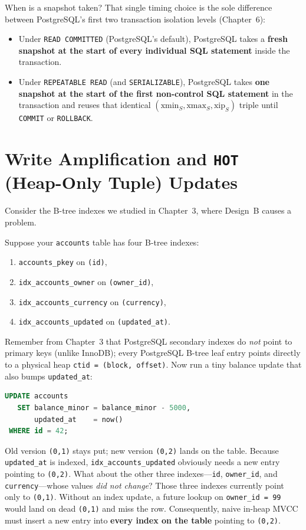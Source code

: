 \begin{walkbox}
When is a snapshot taken? That single timing choice is the sole difference between PostgreSQL's first two transaction isolation levels (Chapter~6):
\begin{itemize}
  \item Under \texttt{READ COMMITTED} (PostgreSQL's default), PostgreSQL takes a \textbf{fresh snapshot at the start of every individual SQL statement} inside the transaction.
  \item Under \texttt{REPEATABLE READ} (and \texttt{SERIALIZABLE}), PostgreSQL takes \textbf{one snapshot at the start of the first non-control SQL statement} in the transaction and reuses that identical $(\mathrm{xmin}_S, \mathrm{xmax}_S, \mathrm{xip}_S)$ triple until \texttt{COMMIT} or \texttt{ROLLBACK}.
\end{itemize}
\end{walkbox}

\section{Write Amplification and \texttt{HOT} (Heap-Only Tuple) Updates}
\label{ch05:hot-updates}

Consider the B-tree indexes we studied in Chapter~3, where Design~B causes a problem.

Suppose your \texttt{accounts} table has four B-tree indexes:
\begin{enumerate}
  \item \texttt{accounts\_pkey} on \texttt{(id)},
  \item \texttt{idx\_accounts\_owner} on \texttt{(owner\_id)},
  \item \texttt{idx\_accounts\_currency} on \texttt{(currency)},
  \item \texttt{idx\_accounts\_updated} on \texttt{(updated\_at)}.
\end{enumerate}
Remember from Chapter~3 that PostgreSQL secondary indexes do \emph{not} point to primary keys (unlike InnoDB); every PostgreSQL B-tree leaf entry points directly to a physical heap \texttt{ctid = (block, offset)}. Now run a tiny balance update that also bumps \texttt{updated\_at}:

\begin{lstlisting}[language=SQL]
UPDATE accounts
   SET balance_minor = balance_minor - 5000,
       updated_at    = now()
 WHERE id = 42;
\end{lstlisting}

Old version \texttt{(0,1)} stays put; new version \texttt{(0,2)} lands on the table. Because \texttt{updated\_at} is indexed, \texttt{idx\_accounts\_updated} obviously needs a new entry pointing to \texttt{(0,2)}. What about the other three indexes---\texttt{id}, \texttt{owner\_id}, and \texttt{currency}---whose values \emph{did not change}? Those three indexes currently point only to \texttt{(0,1)}. Without an index update, a future lookup on \texttt{owner\_id = 99} would land on dead \texttt{(0,1)} and miss the row. Consequently, naive in-heap MVCC must insert a new entry into \textbf{every index on the table} pointing to \texttt{(0,2)}.

